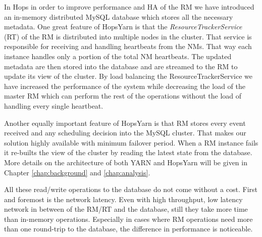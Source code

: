 In Hops in order to improve performance and HA of the RM we have introduced an
in-memory distributed MySQL database which stores all the necessary
metadata. One great feature of HopsYarn is that the
\emph{ResourceTrackerService} (RT) of the RM is distributed into multiple
nodes in the cluster. That service is responsible for receiving and handling
heartbeats from the NMs. That way each instance handles only a portion of the total NM
heartbeats. The updated metadata are then stored into the database and
are streamed to the RM to update its view of the cluster. By load
balancing the ResourceTrackerService we have increased the performance
of the system while decreasing the load of the master RM which can
perform the rest of the operations without the load of handling every
single heartbeat.

Another equally important feature of HopsYarn is that RM stores
every event received and any scheduling decision into the MySQL
cluster. That makes our solution highly available with minimum
failover period. When a RM instance fails it re-builts the view of the
cluster by reading the latest state from the database. More details on
the architecture of both YARN and HopsYarn will be given in Chapter
\ref{chap:background} and \ref{chap:analysis}.

All these read/write operations to the database do not come without
a cost. First and foremost is the network latency. Even with high
throughput, low latency network in between of the RM/RT and the database, still
they take more time than in-memory operations. Especially in cases
where RM operations need more than one round-trip to the database, the
difference in performance is noticeable.